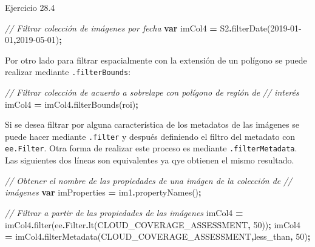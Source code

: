 \documentclass[
  12pt,
  letterpaper,
  twoside]{book}
\newenvironment{Shaded}{\begin{snugshade}}{\end{snugshade}}
\newcommand{\AttributeTok}[1]{\textcolor[rgb]{0.77,0.63,0.00}{#1}}
\newcommand{\CommentTok}[1]{\textcolor[rgb]{0.56,0.35,0.01}{\textit{#1}}}
\newcommand{\DecValTok}[1]{\textcolor[rgb]{0.00,0.00,0.81}{#1}}
\newcommand{\FunctionTok}[1]{\textcolor[rgb]{0.00,0.00,0.00}{#1}}
\newcommand{\KeywordTok}[1]{\textcolor[rgb]{0.13,0.29,0.53}{\textbf{#1}}}
\newcommand{\NormalTok}[1]{#1}
\newcommand{\OperatorTok}[1]{\textcolor[rgb]{0.81,0.36,0.00}{\textbf{#1}}}
\newcommand{\StringTok}[1]{\textcolor[rgb]{0.31,0.60,0.02}{#1}}
\begin{document}
Ejercicio 28.4

\begin{Shaded}
\begin{Highlighting}[]
\CommentTok{// Filtrar colección de imágenes por fecha}
\KeywordTok{var}\NormalTok{ imCol4 }\OperatorTok{=}\NormalTok{ S2}\OperatorTok{.}\FunctionTok{filterDate}\NormalTok{(}\StringTok{\textquotesingle{}2019{-}01{-}01\textquotesingle{}}\OperatorTok{,}\StringTok{\textquotesingle{}2019{-}05{-}01\textquotesingle{}}\NormalTok{)}\OperatorTok{;}
\end{Highlighting}
\end{Shaded}

Por otro lado para filtrar espacialmente con la extensión de un polígono se puede realizar mediante \texttt{.filterBounds}:

\begin{Shaded}
\begin{Highlighting}[]
\CommentTok{// Filtrar colección de acuerdo a sobrelape con polígono de región de }
\CommentTok{// interés}
\NormalTok{imCol4 }\OperatorTok{=}\NormalTok{ imCol4}\OperatorTok{.}\FunctionTok{filterBounds}\NormalTok{(roi)}\OperatorTok{;}
\end{Highlighting}
\end{Shaded}

Si se desea filtrar por alguna característica de los metadatos de las imágenes se puede hacer mediante \texttt{.filter} y después definiendo el filtro del metadato con \texttt{ee.Filter}. Otra forma de realizar este proceso es mediante \texttt{.filterMetadata}. Las siguientes dos líneas son equivalentes ya qye obtienen el mismo resultado.

\begin{Shaded}
\begin{Highlighting}[]
\CommentTok{// Obtener el nombre de las propiedades de una imágen de la colección de }
\CommentTok{// imágenes}
\KeywordTok{var}\NormalTok{ imProperties }\OperatorTok{=}\NormalTok{ im1}\OperatorTok{.}\FunctionTok{propertyNames}\NormalTok{()}\OperatorTok{;}

\CommentTok{// Filtrar a partir de las propiedades de las imágenes}
\NormalTok{imCol4 }\OperatorTok{=}\NormalTok{ imCol4}\OperatorTok{.}\FunctionTok{filter}\NormalTok{(ee}\OperatorTok{.}\AttributeTok{Filter}\OperatorTok{.}\FunctionTok{lt}\NormalTok{(}\StringTok{\textquotesingle{}CLOUD\_COVERAGE\_ASSESSMENT\textquotesingle{}}\OperatorTok{,} \DecValTok{50}\NormalTok{))}\OperatorTok{;}
\NormalTok{imCol4 }\OperatorTok{=}\NormalTok{ imCol4}\OperatorTok{.}\FunctionTok{filterMetadata}\NormalTok{(}\StringTok{\textquotesingle{}CLOUD\_COVERAGE\_ASSESSMENT\textquotesingle{}}\OperatorTok{,}\StringTok{\textquotesingle{}less\_than\textquotesingle{}}\OperatorTok{,} \DecValTok{50}\NormalTok{)}\OperatorTok{;}
\end{Highlighting}
\end{Shaded}
\end{document}
